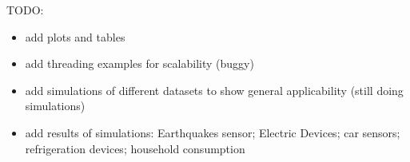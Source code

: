 \documentclass{juliacon}
\begin{document}
TODO: 
\begin{itemize}
\item add plots and tables
\item add threading examples for scalability (buggy)
\item add simulations of different datasets to show general applicability (still doing simulations)
\item add results of simulations: Earthquakes sensor; Electric Devices; car sensors; refrigeration devices; household consumption
\end{itemize}

%
%


\end{document}
